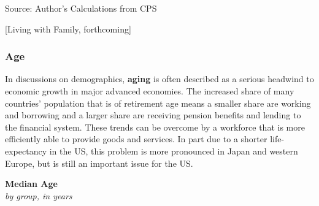 \documentclass{report}
\makeatletter
\newcommand{\tbllink}[1]{\href{https://raw.githubusercontent.com/bdecon/US-chartbook/master/chartbook/data/#1}{\faTable}}
\newcommand*\short[1]{\expandafter\@gobbletwo\number\numexpr#1\relax}
\newcommand{\absnode}[3]{\node[below right, align=left] at (axis cs: #1,#2) {#3};}
\newcommand{\shdateaxisticks}{
		date coordinates in=x, axis line style={draw=none},
		xmax={2024-01-31},
		max space between ticks=40,	    
		xtick={{1990-01-01}, {1995-01-01}, {2000-01-01}, 
			{2005-01-01}, {2010-01-01}, {2015-01-01}, {2020-01-01}},
		minor xtick={},
		enlarge y limits={0.06}, enlarge x limits={0.01},
		xticklabel style={align=center, yshift=-2pt}, tick label style={inner sep=0pt},
		}
\newcommand{\bbar}[2]{extra #1 ticks = {{#2}}, extra #1 tick labels = ,
		extra #1 tick style = {grid=major, grid style={thick, black!25}},}
\newcommand{\stdline}[4]{\addplot[very thick, no markers, color=#1] 
		table [x=#2, y=#3, col sep=comma] {#4};	}
\newcommand{\rbars}{
		\fill[color=black!10] (axis cs:{1990-07-01},\pgfkeysvalueof{/pgfplots/ymin})
			rectangle (axis cs:{1991-03-01}, \pgfkeysvalueof{/pgfplots/ymax});
		\fill[color=black!10] (axis cs:{2007-12-01},\pgfkeysvalueof{/pgfplots/ymin})
			rectangle (axis cs:{2009-07-01}, \pgfkeysvalueof{/pgfplots/ymax});
		\fill[color=black!10] (axis cs:{2001-03-01},\pgfkeysvalueof{/pgfplots/ymin})
			rectangle (axis cs:{2001-11-01}, \pgfkeysvalueof{/pgfplots/ymax});
		\fill[color=black!10] (axis cs:{2020-02-01},\pgfkeysvalueof{/pgfplots/ymin})
			rectangle (axis cs:{2020-05-01}, \pgfkeysvalueof{/pgfplots/ymax});}
\newcommand{\rebars}{
		\fill[color=black!10] (axis cs:{2007-12-01},\pgfkeysvalueof{/pgfplots/ymin}) 
			rectangle (axis cs:{2009-07-01}, \pgfkeysvalueof{/pgfplots/ymax});
		\fill[color=black!10] (axis cs:{2001-03-01},\pgfkeysvalueof{/pgfplots/ymin}) 
			rectangle (axis cs:{2001-11-01}, \pgfkeysvalueof{/pgfplots/ymax});
		\fill[color=black!10] (axis cs:{2020-02-01},\pgfkeysvalueof{/pgfplots/ymin}) 
			rectangle (axis cs:{2020-05-01}, \pgfkeysvalueof{/pgfplots/ymax});}
\makeatother
\begin{document}
{\begin{minipage}{0.47\textwidth}
\hspace{2mm} 

\footnotesize{Source: Author's Calculations from CPS} \hfill \tbllink{headship.csv} 
\end{minipage}
\vspace{4cm}

\normalsize [Living with Family, forthcoming]
\newpage
\begin{minipage}{1.0\textwidth} 
\subsubsection*{Age}
\small In discussions on demographics, \textbf{aging} is often described as a serious headwind to economic growth in major advanced economies. The increased share of many countries' population that is of retirement age means a smaller share are working and borrowing and a larger share are receiving pension benefits and lending to the financial system. These trends can be overcome by a workforce that is more efficiently able to provide goods and services. In part due to a shorter life-expectancy in the US, this problem is more pronounced in Japan and western Europe, but is still an important issue for the US.

\begin{minipage}{0.41\textwidth}
\small 
\end{minipage}\hfill
\begin{minipage}{0.53\textwidth}
\normalsize \textbf{Median Age}\\
\footnotesize{\textit{by group, in years}}
\vspace{4.0cm}

\hspace{2mm} 


\end{minipage}
\end{minipage}}
\end{document}
